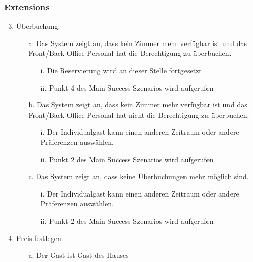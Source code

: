 \documentclass[./detailed_overview_usecases.tex]{subfiles}
\begin{document}
    \subsubsection*{Extensions}
    \begin{enumerate}
        \setcounter{enumi}{2}
        \item Überbuchung:
                \begin{itemize}
                       \item[a.] Das System zeigt an, dass kein Zimmer mehr verfügbar ist und das Front/Back-Office Personal hat die Berechtigung zu überbuchen.
                            \begin{itemize}
                                \item[i.] Die Reservierung wird an dieser Stelle fortgesetzt
                                \item[ii.] Punkt 4 des Main Success Szenarios wird aufgerufen
                            \end{itemize}
                       \item[b.] Das System zeigt an, dass kein Zimmer mehr verfügbar ist und das Front/Back-Office Personal hat nicht die Berechtigung zu überbuchen.
                            \begin{itemize}
                                \item[i.] Der Individualgast kann einen anderen Zeitraum oder andere Präferenzen auswählen.
                                \item[ii.] Punkt 2 des Main Success Szenarios wird aufgerufen
                            \end{itemize}
                       \item[c.] Das System zeigt an, dass keine Überbuchungen mehr möglich sind.
                            \begin{itemize}
                                \item[i.] Der Individualgast kann einen anderen Zeitraum oder andere Präferenzen auswählen.
                                \item[ii.] Punkt 2 des Main Success Szenarios wird aufgerufen
                             \end{itemize}
                \end{itemize}
        \setcounter{emuni}{4}
        \item Preis festlegen
            \begin{itemize}
                \item[a.] Der Gast ist Gast des Hauses

\end{itemize}
\end{enumerate}
\end{document}
